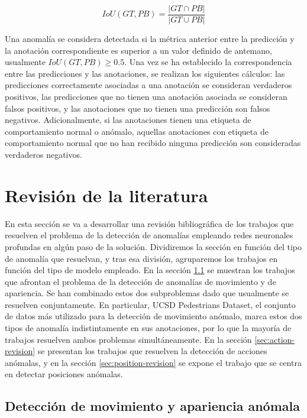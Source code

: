 \documentclass[../main.tex]{memoir}
\begin{document}
\[ IoU(GT, PB) = \frac{\vert GT \cap PB \vert}{\vert GT \cup PB \vert} \]

Una anomalía se considera detectada si la métrica anterior entre la
predicción y la anotación correspondiente es superior a un valor
definido de antemano, usualmente $IoU(GT,PB) \geq 0.5$. Una vez se ha
establecido la correspondencia entre las predicciones y las
anotaciones, se realizan los siguientes cálculos: las predicciones
correctamente asociadas a una anotación se consideran verdaderos
positivos, las predicciones que no tienen una anotación asociada se
consideran falsos positivos, y las anotaciones que no tienen una
predicción son falsos negativos. Adicionalmente, si las anotaciones
tienen una etiqueta de comportamiento normal o anómalo, aquellas
anotaciones con etiqueta de comportamiento normal que no han recibido
ninguna predicción son consideradas verdaderos negativos.

\section{Revisión de la literatura}

En esta sección se va a desarrollar una revisión bibliográfica de los
trabajos que resuelven el problema de la detección de anomalías
empleando redes neuronales profundas en algún paso de la solución.
Dividiremos la sección en función del tipo de anomalía que resuelvan,
y tras esa división, agruparemos los trabajos en función del tipo de
modelo empleado. En la sección \ref{sec:motion-appearance-revision} se
muestran los trabajos que afrontan el problema de la detección de
anomalías de movimiento y de apariencia. Se han combinado estos dos
subproblemas dado que usualmente se resuelven conjuntamente. En
particular, UCSD Pedestrians Dataset, el conjunto de datos más
utilizado para la detección de movimiento anómalo, marca estos dos
tipos de anomalía indistintamente en sus anotaciones, por lo que la
mayoría de trabajos resuelven ambos problemas simultáneamente. En la
sección \ref{sec:action-revision} se presentan los trabajos que
resuelven la detección de acciones anómalas, y en la sección
\ref{sec:position-revision} se expone el trabajo que se centra
en detectar posiciones anómalas.

\subsection{Detección de movimiento y apariencia anómala}
\label{sec:motion-appearance-revision}
\end{document}
